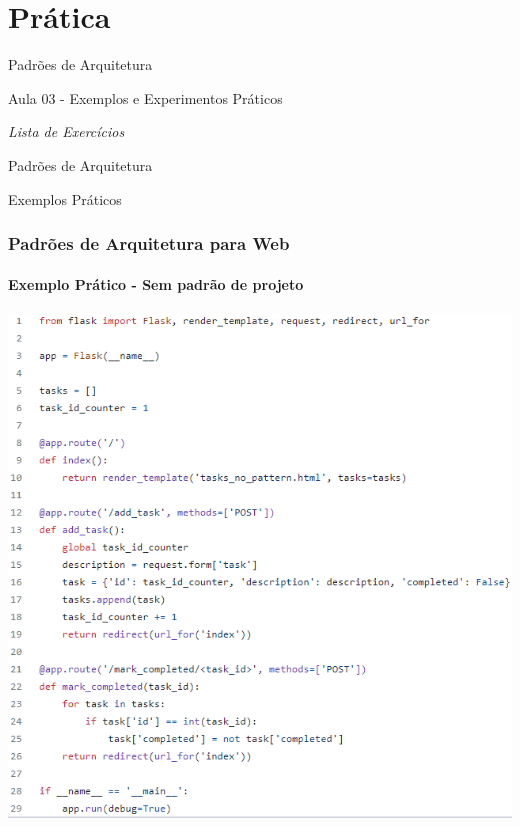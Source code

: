 \documentclass[
	9pt, %
	t, %
]{beamer}
\begin{document}

\section{Prática}

\begin{frame}
	\begin{center}
		
		\bigskip\bigskip\bigskip\bigskip %
		{\Large Padrões de Arquitetura}
		
		\bigskip\bigskip %
		{\Huge Aula 03 - Exemplos e Experimentos Práticos}
		
		\smallskip
		{\small \textit{Lista de Exercícios}}
	\end{center}

\end{frame}


\begin{frame}
	\begin{center}
		
		\bigskip\bigskip\bigskip\bigskip %
		{\Large Padrões de Arquitetura}
		
		\bigskip\bigskip %
		{\Huge Exemplos Práticos}
	\end{center}

\end{frame}

\begin{frame}
	\frametitle{Padrões de Arquitetura para Web}
	\framesubtitle{Exemplo Prático - Sem padrão	de projeto}

	\includegraphics[width=0.6\linewidth]{Images/no_pattern.png}

\end{frame}
\end{document}
